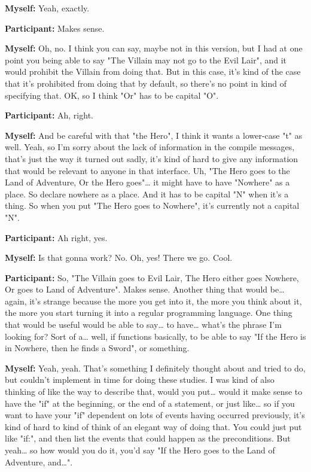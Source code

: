 \documentclass[11pt]{report}
\newcommand{\llabel}[1]{\hypertarget{llineno:#1}{\linelabel{#1}}}
\begin{document}
\begin{linenumbers}
\textbf{Myself:} Yeah, exactly.

\textbf{Participant:} Makes sense.

\textbf{Myself:} Oh, no. I think you can say, maybe not in this version, but I had at one point you being able to say "The Villain may not go to the Evil Lair", and it would prohibit the Villain from doing that. But in this case, it's kind of the case that it's prohibited from doing that by default, so there's no point in kind of specifying that. OK, so I think "Or" has to be capital "O".\llabel{lne:syntax5d2}

\textbf{Participant:} Ah, right.

\textbf{Myself:} And be careful with that "the Hero", I think it wants a lower-case "t" as well. Yeah, so I'm sorry about the lack of information in the compile messages, that's just the way it turned out sadly, it's kind of hard to give any information that would be relevant to anyone in that interface. Uh, "The Hero goes to the Land of Adventure, Or the Hero goes"\ldots{} it might have to have "Nowhere" as a place. So declare nowhere as a place. And it has to be capital "N" when it's a thing. So when you put "The Hero goes to Nowhere", it's currently not a capital "N".\llabel{lne:syntax5d3}

\textbf{Participant:} Ah right, yes.

\textbf{Myself:} Is that gonna work? No. Oh, yes! There we go. Cool.

\textbf{Participant:} So, "The Villain goes to Evil Lair, The Hero either goes Nowhere, Or goes to Land of Adventure". Makes sense. Another thing that would be\ldots{} again, it's strange because the more you get into it, the more you think about it, the more you start turning it into a regular programming language. One thing that would be useful would be able to say\ldots{} to have\ldots{} what's the phrase I'm looking for? Sort of a\ldots{} well, if functions basically, to be able to say "If the Hero is in Nowhere, then he finds a Sword", or something.\llabel{lne:feature8d}

\textbf{Myself:} Yeah, yeah. That's something I definitely thought about and tried to do, but couldn't implement in time for doing these studies. I was kind of also thinking of like the way to describe that, would you put\ldots{} would it make sense to have the "if" at the beginning, or the end of a statement, or just like\ldots{} so if you want to have your "if" dependent on lots of events having occurred previously, it's kind of hard to kind of think of an elegant way of doing that. You could just put like "if:", and then list the events that could happen as the preconditions. But yeah\ldots{} so how would you do it, you'd say "If the Hero goes to the Land of Adventure, and\ldots{}".


\end{linenumbers}
\end{document}
